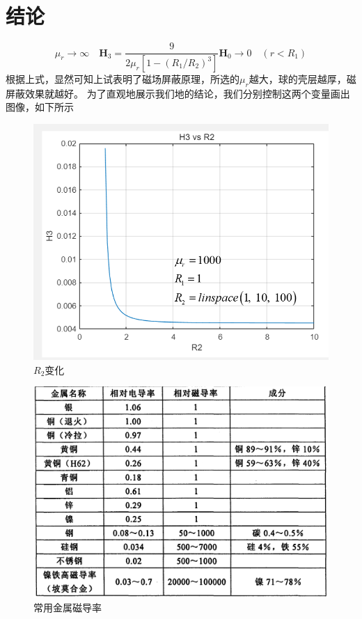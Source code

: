 \documentclass{article}
\begin{document}
\section{结论}
\begin{equation}
  \mu_{r} \rightarrow \infty \quad \boldsymbol{H}_{3}=\frac{9}{2 \mu_{r}\left[1-\left(R_{1} / R_{2}\right)^{3}\right]} \boldsymbol{H}_{0} \rightarrow 0 \quad\left(r<R_{1}\right)\tag{3.1}
\end{equation}
根据上式，显然可知上试表明了磁场屏蔽原理，所选的$\mu_r$越大，球的壳层越厚，磁屏蔽效果就越好。
为了直观地展示我们地的结论，我们分别控制这两个变量画出图像，如下所示
        \begin{figure}[H]
            \centering
            \includegraphics[width=12cm]{img/7.png}
            \caption[]{$R_2$变化}
            \end{figure}
            \begin{figure}[H]
              \centering
              \includegraphics[width=12cm]{img/10.png}
              \caption[]{常用金属磁导率}
            \end{figure}
\end{document}
